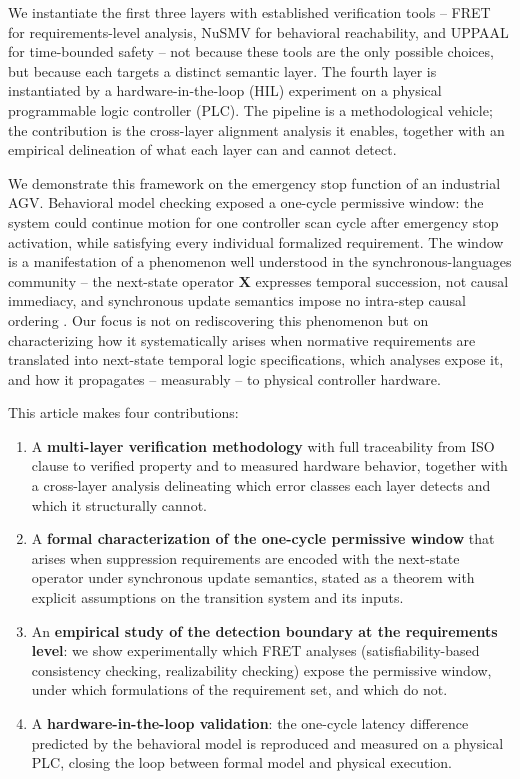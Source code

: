 \documentclass{ieeeaccess}
\theoremstyle{definition}
\newcommand{\X}{\mathbf{X}}
\begin{document}
We instantiate the first three layers with established verification tools -- FRET \cite{Giannakopoulou2018FRET,Giannakopoulou2019FRET} for requirements-level analysis, NuSMV \cite{Cimatti2002NuSMV} for behavioral reachability, and UPPAAL \cite{Behrmann2006UPPAAL} for time-bounded safety -- not because these tools are the only possible choices, but because each targets a distinct semantic layer. The fourth layer is instantiated by a hardware-in-the-loop (HIL) experiment on a physical programmable logic controller (PLC). The pipeline is a methodological vehicle; the contribution is the cross-layer alignment analysis it enables, together with an empirical delineation of what each layer can and cannot detect.

We demonstrate this framework on the emergency stop function of an industrial AGV. Behavioral model checking exposed a one-cycle permissive window: the system could continue motion for one controller scan cycle after emergency stop activation, while satisfying every individual formalized requirement. The window is a manifestation of a phenomenon well understood in the synchronous-languages community -- the next-state operator $\X$ expresses temporal succession, not causal immediacy, and synchronous update semantics impose no intra-step causal ordering \cite{Esterel,Halbwachs}. Our focus is not on rediscovering this phenomenon but on characterizing how it systematically arises when normative requirements are translated into next-state temporal logic specifications, which analyses expose it, and how it propagates -- measurably -- to physical controller hardware.

\smallskip
\noindent
This article makes four contributions:
\begin{enumerate}
  \item A \textbf{multi-layer verification methodology} with full traceability from ISO clause to verified property and to measured hardware behavior, together with a cross-layer analysis delineating which error classes each layer detects and which it structurally cannot.
  \item A \textbf{formal characterization of the one-cycle permissive window} that arises when suppression requirements are encoded with the next-state operator under synchronous update semantics, stated as a theorem with explicit assumptions on the transition system and its inputs.
  \item An \textbf{empirical study of the detection boundary at the requirements level}: we show experimentally which FRET analyses (satisfiability-based consistency checking, realizability checking) expose the permissive window, under which formulations of the requirement set, and which do not.
  \item A \textbf{hardware-in-the-loop validation}: the one-cycle latency difference predicted by the behavioral model is reproduced and measured on a physical PLC, closing the loop between formal model and physical execution.
\end{enumerate}
\end{document}
